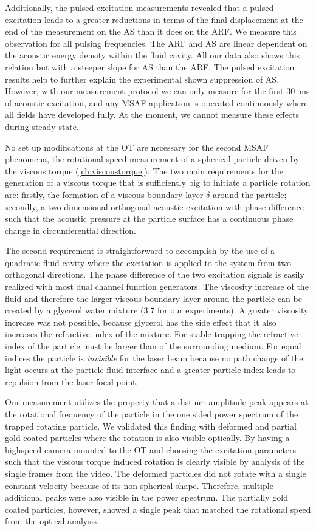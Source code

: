 Additionally, the pulsed excitation measurements revealed that a pulsed 
excitation leads to a greater reductions in terms of the final displacement at 
the end of the measurement on the AS than it does on the ARF. We measure this 
observation for all pulsing frequencies. The ARF and AS are linear dependent on 
the acoustic energy density within the fluid cavity. All our data also shows 
this relation but with a steeper slope for AS than the ARF. The pulsed 
excitation results help to further explain the experimental shown suppression 
of AS. However, with our measurement protocol we can only measure for the first 
\SI{30}{\ms} of acoustic excitation, and any MSAF application is operated 
continuously where all fields have developed fully. At the moment, we cannot 
measure these effects during steady state.


No set up modifications at the OT are necessary for the second MSAF phenomena, 
the rotational speed measurement of a spherical particle driven by the viscous 
torque (\cref{ch:viscoustorque}). The two main requirements for the generation 
of a viscous torque that is sufficiently big to initiate a particle rotation 
are: firstly, the formation of a viscous boundary layer $\delta$ around the 
particle; secondly, a two dimensional orthogonal acoustic excitation with phase 
difference such that the acoustic pressure at the particle surface has a 
continuous phase change in circumferential direction.

The second requirement is straightforward to accomplish by the use of a 
quadratic fluid cavity where the excitation is applied to the system from two 
orthogonal directions. The phase difference of the two excitation signals is 
easily realized with most dual channel function generators. The viscosity 
increase of the fluid and therefore the larger viscous boundary layer around 
the particle can be created by a glycerol water mixture (3:7 for our 
experiments). A greater viscosity increase was not possible, because glycerol 
has the side effect that it also increases the refractive index of the mixture. 
For stable trapping the refractive index of the particle must be larger than of 
the surrounding medium. For equal indices the particle is \emph{invisible} for 
the laser beam because no path change of the light occurs at the particle-fluid 
interface and a greater particle index leads to repulsion from the laser focal 
point.

Our measurement utilizes the property that a distinct amplitude peak appears at 
the rotational frequency of the particle in the one sided power spectrum of the 
trapped rotating particle. We validated this finding with deformed and partial 
gold coated particles where the rotation is also visible optically. By having a 
highspeed camera mounted to the OT and choosing the excitation parameters such 
that the viscous torque induced rotation is clearly visible by analysis of the 
single frames from the video. The deformed particles did not rotate with a 
single constant velocity because of its non-spherical shape. Therefore, 
multiple additional peaks were also visible in the power spectrum. The 
partially gold coated particles, however, showed a single peak that matched the 
rotational speed from the optical analysis.


